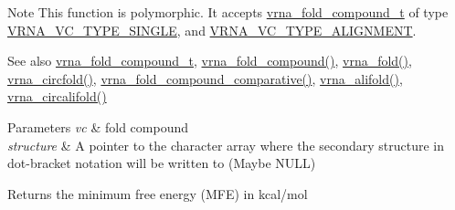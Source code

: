 \begin{DoxyNote}{Note}
This function is polymorphic. It accepts \hyperlink{group__fold__compound_ga1b0cef17fd40466cef5968eaeeff6166}{vrna\+\_\+fold\+\_\+compound\+\_\+t} of type \hyperlink{group__fold__compound_gga01a4ff86fa71deaaa5d1abbd95a1447da1608d3aa78905fc39e0d25a624ac9512}{V\+R\+N\+A\+\_\+\+V\+C\+\_\+\+T\+Y\+P\+E\+\_\+\+S\+I\+N\+G\+LE}, and \hyperlink{group__fold__compound_gga01a4ff86fa71deaaa5d1abbd95a1447da056345f1bcfe7cd595d1fd437c05246d}{V\+R\+N\+A\+\_\+\+V\+C\+\_\+\+T\+Y\+P\+E\+\_\+\+A\+L\+I\+G\+N\+M\+E\+NT}.
\end{DoxyNote}
\begin{DoxySeeAlso}{See also}
\hyperlink{group__fold__compound_ga1b0cef17fd40466cef5968eaeeff6166}{vrna\+\_\+fold\+\_\+compound\+\_\+t}, \hyperlink{group__fold__compound_ga6601d994ba32b11511b36f68b08403be}{vrna\+\_\+fold\+\_\+compound()}, \hyperlink{group__mfe__fold__single_ga29a33b2895f4e67b0480271ff289afdc}{vrna\+\_\+fold()}, \hyperlink{group__mfe__fold__single_gaf973483d8acbc8cc9aacfc8a9b7f0074}{vrna\+\_\+circfold()}, \hyperlink{group__fold__compound_gad6bacc816af274922b13d947f708aa0c}{vrna\+\_\+fold\+\_\+compound\+\_\+comparative()}, \hyperlink{group__consensus__mfe__fold_ga6c9d3bef3e92c6d423ffac9f981418c1}{vrna\+\_\+alifold()}, \hyperlink{group__consensus__mfe__fold_ga17a1be7490468c29c335ba9bffacba53}{vrna\+\_\+circalifold()}
\end{DoxySeeAlso}

\begin{DoxyParams}{Parameters}
{\em vc} & fold compound \\
\hline
{\em structure} & A pointer to the character array where the secondary structure in dot-\/bracket notation will be written to (Maybe N\+U\+LL)\\
\hline
\end{DoxyParams}
\begin{DoxyReturn}{Returns}
the minimum free energy (M\+FE) in kcal/mol 
\end{DoxyReturn}
